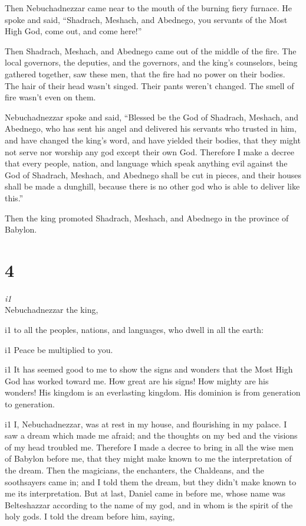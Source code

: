  Then Nebuchadnezzar came near to the mouth of the
burning fiery furnace. He spoke and said, ``Shadrach, Meshach, and
Abednego, you servants of the Most High God, come out, and come here!''

Then Shadrach, Meshach, and Abednego came out of the middle of the fire.
 The local governors, the deputies, and the governors,
and the king's counselors, being gathered together, saw these men, that
the fire had no power on their bodies. The hair of their head wasn't
singed. Their pants weren't changed. The smell of fire wasn't even on
them.

 Nebuchadnezzar spoke and said, ``Blessed be the God of
Shadrach, Meshach, and Abednego, who has sent his angel and delivered
his servants who trusted in him, and have changed the king's word, and
have yielded their bodies, that they might not serve nor worship any god
except their own God.  Therefore I make a decree that
every people, nation, and language which speak anything evil against the
God of Shadrach, Meshach, and Abednego shall be cut in pieces, and their
houses shall be made a dunghill, because there is no other god who is
able to deliver like this.''

 Then the king promoted Shadrach, Meshach, and Abednego
in the province of Babylon.

\hypertarget{section-3}{%
\section{4}\label{section-3}}

\emph{i1}\\
 Nebuchadnezzar the king,

i1 to all the peoples, nations, and languages, who dwell in all the
earth:

i1 Peace be multiplied to you.

i1  It has seemed good to me to show the signs and wonders
that the Most High God has worked toward me.  How great
are his signs! How mighty are his wonders! His kingdom is an everlasting
kingdom. His dominion is from generation to generation.

i1  I, Nebuchadnezzar, was at rest in my house, and
flourishing in my palace.  I saw a dream which made me
afraid; and the thoughts on my bed and the visions of my head troubled
me.  Therefore I made a decree to bring in all the wise
men of Babylon before me, that they might make known to me the
interpretation of the dream.  Then the magicians, the
enchanters, the Chaldeans, and the soothsayers came in; and I told them
the dream, but they didn't make known to me its interpretation.
 But at last, Daniel came in before me, whose name was
Belteshazzar according to the name of my god, and in whom is the spirit
of the holy gods. I told the dream before him, saying,

